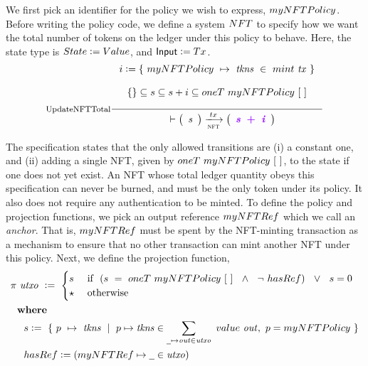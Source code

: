 We first pick an identifier for the policy we wish to express,
$\fun{myNFTPolicy}$. Before writing the policy code, we define a system
$\fun{NFT}$ to specify how we want
the total number of tokens on the ledger under this policy to behave.
Here, the state type is $\State \leteq \Value$, and $\Input \leteq \Tx$.
\begin{equation}
  \inference[UpdateNFTTotal]
  {
  i \leteq \{~\fun{myNFTPolicy}~\mapsto~\var{tkns}~\in~ \fun{mint}~\var{tx}~\} \\~\\
  \{\} \subseteq s \subseteq s + i \subseteq \fun{oneT}~\fun{myNFTPolicy}~[~]
  \\ ~ \\
  }
  {
  \begin{array}{l}
    \\
  \end{array}
    \vdash
    \left(
    \begin{array}{r}
      \var{s} \\
    \end{array}
    \right)
    \trans{nft}{tx}
    \left(
    \begin{array}{r}
      \varUpdate{\var{s}~+~\var{i}}  \\
    \end{array}
    \right) \\
  }
\end{equation}

The specification states that the only allowed transitions are (i) a constant one,
and (ii) adding a single NFT, given by $\fun{oneT}~\fun{myNFTPolicy}~[~]$, to the state if
one does not yet exist. An NFT whose total ledger quantity obeys this specification
can never be burned, and must be the only token under its policy. It also
does not require any authentication to be minted. To define the policy and
projection functions, we pick an output reference $\fun{myNFTRef}$ which we call an
\emph{anchor}. That is,
$\fun{myNFTRef}$ must be spent by the NFT-minting transaction as a
mechanism to ensure that no other transaction can mint another NFT under this policy.
Next, we define the projection function,
\begin{align*}
  & \pi~\var{utxo}~ \leteq~\begin{cases}
    s & \text{ if~~} (s ~=~ \fun{oneT}~\fun{myNFTPolicy}~[~]~~\wedge~~\neg~\fun{hasRef}) ~~\vee~~ s = 0\\
    \emptytype & \text{ otherwise } \\
  \end{cases} \\
  &  \where \\
  &  ~~~~s \leteq~ \{~p~\mapsto~ \var{tkns}~\mid~p\mapsto \var{tkns} \in \sum_{\wcard \mapsto \var{out}\in \var{utxo}}~\val~\var{out},~p = \fun{myNFTPolicy}~\}  \\
  &  ~~~~\fun{hasRef} \leteq (\fun{myNFTRef} \mapsto \wcard \in \var{utxo})
\end{align*}

